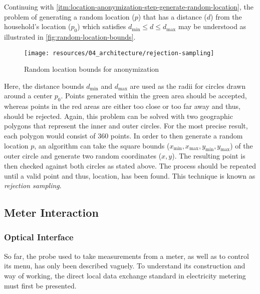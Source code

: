 Continuing with \ref{itm:location-anonymization-step-generate-random-location}, the problem of generating a random location ($p$) that has a distance ($d$) from the household's location ($p_0$) which satisfies $d_{\text{min}} \leq d \leq d_{\text{max}}$ may be understood as illustrated in \autoref{fig:random-location-bounds}.

\begin{figure}[hbt]
  \centering
  \texttt{[image: resources/04\_architecture/rejection-sampling]}
  \caption{Random location bounds for anonymization}
  \label{fig:random-location-bounds}
\end{figure}

Here, the distance bounds $d_{\text{min}}$ and $d_{\text{max}}$ are used as the radii for circles drawn around a center $p_0$. Points generated within the green area should be accepted, whereas points in the red areas are either too close or too far away and thus, should be rejected. Again, this problem can be solved with two geographic polygons that represent the inner and outer circles. For the most precise result, each polygon would consist of 360 points. In order to then generate a random location $p$, an algorithm can take the square bounds ($x_{\text{min}}, x_{\text{max}}, y_{\text{min}}, y_{\text{max}}$) of the outer circle and generate two random coordinates ($x,y$). The resulting point is then checked against both circles as stated above. The process should be repeated until a valid point and thus, location, has been found. This technique is known as \textit{rejection sampling}.


\subsection{Meter Interaction}
\label{sec:meter-interaction}

\subsubsection{Optical Interface}
\label{sec:meter-interface}

So far, the probe used to take measurements from a meter, as well as to control its menu, has only been described vaguely. To understand its construction and way of working, the direct local data exchange standard in electricity metering must first be presented.

